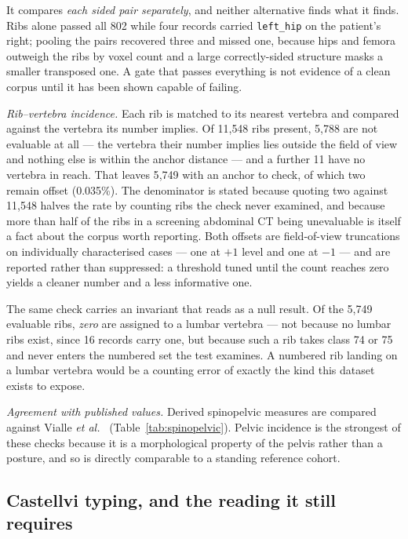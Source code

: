 \documentclass[aapm,mph,amsmath,amssymb,reprint,linenumbers]{revtex4-2}
\begin{document}
It compares \emph{each sided pair separately}, and neither alternative finds what it finds.
Ribs alone passed all 802 while four records carried \texttt{left\_hip} on the patient's
right; pooling the pairs recovered three and missed one, because hips and femora outweigh the
ribs by voxel count and a large correctly-sided structure masks a smaller transposed one. A
gate that passes everything is not evidence of a clean corpus until it has been shown capable
of failing.

\emph{Rib--vertebra incidence.} Each rib is matched to its nearest vertebra and compared
against the vertebra its number implies. Of 11{,}548 ribs present, 5{,}788 are not
evaluable at all --- the vertebra their number implies lies outside the field of view and
nothing else is within the anchor distance --- and a further 11 have no vertebra in reach.
That leaves 5{,}749 with an anchor to check, of which two remain offset (0.035\%). The
denominator is stated because quoting two against 11{,}548 halves the rate by counting
ribs the check never examined, and because more than half of the ribs in a screening
abdominal CT being unevaluable is itself a fact about the corpus worth reporting. Both
offsets are field-of-view truncations on individually characterised cases --- one at
$+1$ level and one at $-1$ --- and are reported rather than suppressed: a threshold tuned
until the count reaches zero yields a cleaner number and a less informative one.

The same check carries an invariant that reads as a null result. Of the 5{,}749 evaluable
ribs, \emph{zero} are assigned to a lumbar vertebra --- not because no lumbar ribs exist,
since 16 records carry one, but because such a rib takes class 74 or 75 and never enters the
numbered set the test examines. A numbered rib landing on a lumbar vertebra would be a
counting error of exactly the kind this dataset exists to expose.

\emph{Agreement with published values.} Derived spinopelvic measures are compared against
Vialle \emph{et al.}~\cite{vialle2005} (Table~\ref{tab:spinopelvic}). Pelvic incidence is
the strongest of these checks because it is a morphological property of the pelvis rather
than a posture, and so is directly comparable to a standing reference cohort.

\subsection{Castellvi typing, and the reading it still requires}
\end{document}
